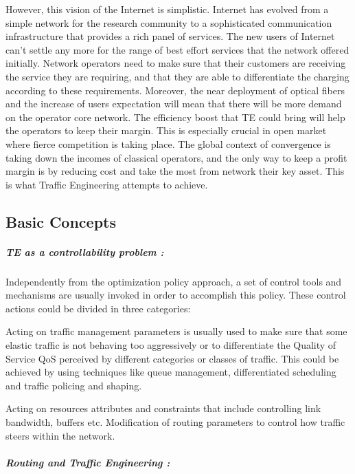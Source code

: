 However, this vision of the Internet is simplistic. Internet has evolved from a simple network for the research community to a sophisticated communication infrastructure that provides a rich panel of services. The new users of Internet can't settle any more for the range of best  effort services that the network offered initially. Network operators need to make sure that their customers are receiving the service they are requiring, and that they are able to differentiate the charging according to  these requirements. Moreover, the near deployment of  optical fibers and the increase of users expectation will mean that there will be more demand on the operator core network. The efficiency boost that TE could bring will help the operators to keep their margin. This is especially crucial in open market where  fierce competition is taking place. The global context of convergence is taking down the incomes of classical operators, and the only way to keep a profit margin is by reducing cost and take the most from network their key asset. This is what Traffic Engineering attempts to achieve.

\subsection{Basic Concepts}

\subparagraph{TE as a controllability problem :}

Independently from the optimization policy approach, a set of control tools and mechanisms are usually invoked in order to accomplish this policy. These control actions could be divided in three categories: 

Acting on traffic management parameters is usually used to make sure that some elastic traffic is not behaving too aggressively or to differentiate the Quality of Service QoS perceived by different categories or classes of traffic. This could be achieved by using techniques like queue management, differentiated scheduling and traffic policing and shaping.

Acting on resources attributes and constraints that include controlling link bandwidth, buffers etc. 
Modification of routing parameters to control how traffic steers within the network. 

\subparagraph{Routing and Traffic Engineering :}

